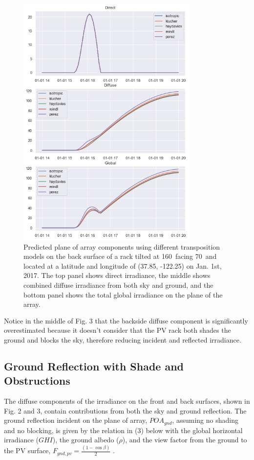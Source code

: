 \documentclass[conference]{IEEEtran}
\begin{document}
\begin{figure}
\centering
\includegraphics[width=9cm]{backside_transposition.png}
\caption{Predicted plane of array components using different transposition models on the back surface of a rack tilted at 160\degree\ facing 70\degree\ and located at a latitude and longitude of (37.85\degree, -122.25\degree) on Jan. 1st, 2017.  The top panel shows direct irradiance, the middle shows combined diffuse irradiance from both sky and ground, and the bottom panel shows the total global irradiance on the plane of the array.}
\end{figure}

Notice in the middle of Fig. 3 that the backside diffuse component is significantly overestimated because it doesn’t consider that the PV rack both shades the ground and blocks the sky, therefore reducing incident and reflected irradiance.

\subsection{ Ground Reflection with Shade and Obstructions}
The diffuse components of the irradiance on the front and back surfaces, shown in Fig. 2 and 3, contain contributions from both the sky and ground reflection.  The ground reflection incident on the plane of array, $POA_{gnd}$, assuming no shading and no blocking, is given by the relation in (3) below with the global horizontal irradiance ($GHI$), the ground albedo ($\rho$), and the view factor from the ground to the PV surface, $F_{gnd,pv} = \frac{\left(1-\cos\beta\right)}{2}$ \cite{Marion2017}.
\end{document}
